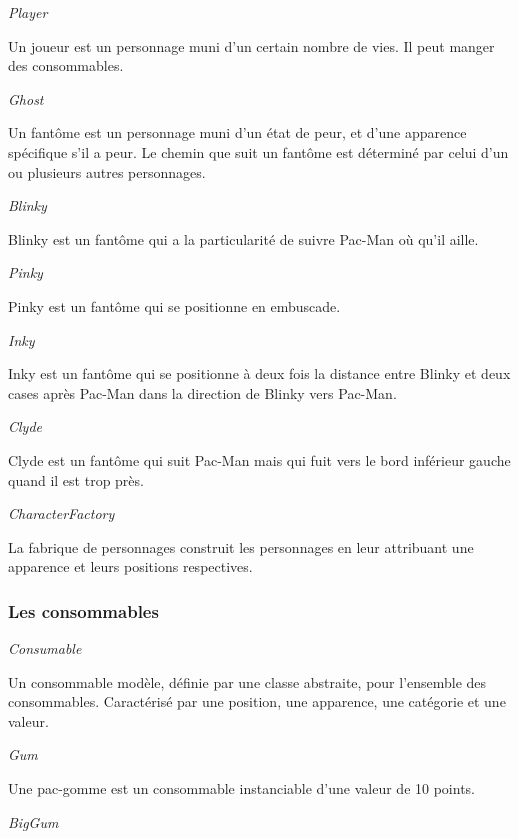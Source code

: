 \documentclass{article}
\begin{document}
\medskip

\textit{Player}

Un joueur est un personnage muni d’un certain nombre de vies. Il peut manger des consommables.

\medskip

\textit{Ghost}

Un fantôme est un personnage muni d’un état de peur, et d’une apparence spécifique s’il a peur. Le chemin que suit un fantôme est déterminé par celui d’un ou plusieurs autres personnages.

\medskip

\textit{Blinky}

Blinky est un fantôme qui a la particularité de suivre Pac-Man où qu’il aille.

\medskip

\textit{Pinky}

Pinky est un fantôme qui se positionne en embuscade.

\medskip

\textit{Inky}

Inky est un fantôme qui se positionne à deux fois la distance entre Blinky et deux cases après Pac-Man dans la direction de Blinky vers Pac-Man.

\medskip

\textit{Clyde}

Clyde est un fantôme qui suit Pac-Man mais qui fuit vers le bord inférieur gauche quand il est trop près.

\medskip

\textit{CharacterFactory}

La fabrique de personnages construit les personnages en leur attribuant une apparence et leurs positions respectives.

\subsubsection{Les consommables}

\textit{Consumable}

Un consommable modèle, définie par une classe abstraite, pour l’ensemble des consommables. Caractérisé par une position, une apparence, une catégorie et une valeur.

\medskip

\textit{Gum}

Une pac-gomme est un consommable instanciable d'une valeur de 10 points.

\medskip

\textit{BigGum}
\end{document}
